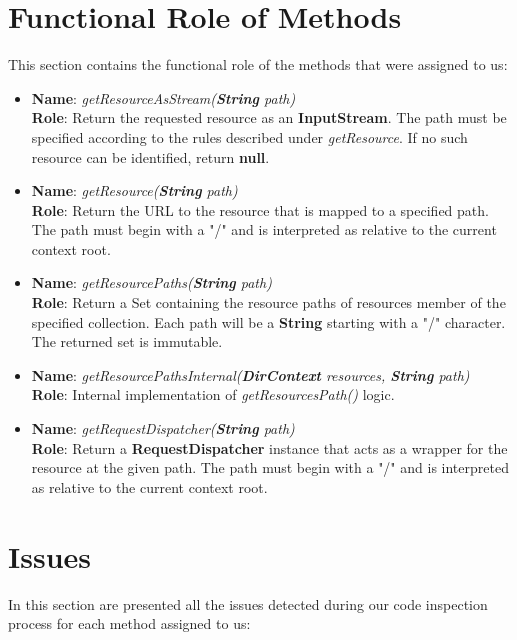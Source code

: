 \section{Functional Role of Methods}
This section contains the functional role of the methods that were assigned to us:
\begin{itemize}
	\item \textbf{Name}: \textit{getResourceAsStream(\textbf{String} path)}\\
		\textbf{Role}: Return the requested resource as an \textbf{InputStream}. The path must be specified according to the rules described under \textit{getResource}. If no such resource can be identified, return \textbf{null}.
	\item \textbf{Name}: \textit{getResource(\textbf{String} path)}\\
		\textbf{Role}: Return the URL to the resource that is mapped to a specified path. The path must begin with a "/" and is interpreted as relative to the current context root.
	\item \textbf{Name}: \textit{getResourcePaths(\textbf{String} path)}\\
		\textbf{Role}: Return a Set containing the resource paths of resources member of the specified collection. Each path will be a \textbf{String} starting with a "/" character. The returned set is immutable.
	\item \textbf{Name}: \textit{getResourcePathsInternal(\textbf{DirContext} resources, \textbf{String} path)}\\
		\textbf{Role}: Internal implementation of \textit{getResourcesPath()} logic.
	\item \textbf{Name}: \textit{getRequestDispatcher(\textbf{String} path)}\\
		\textbf{Role}: Return a \textbf{RequestDispatcher} instance that acts as a wrapper for the resource at the given path. The path must begin with a "/" and is interpreted as relative to the current context root.
\end{itemize}

\section{Issues}
In this section are presented all the issues detected during our code inspection process for each method assigned to us:

